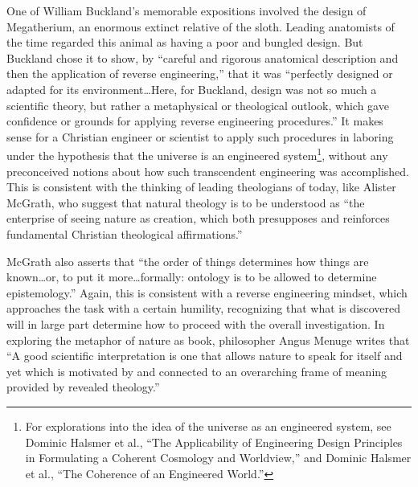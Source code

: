 One of William Buckland’s memorable expositions involved the design of
Megatherium, an enormous extinct relative of the
sloth.\citep[][pg. 245]{roberts1999}
Leading anatomists of the time regarded this
animal as having a poor and bungled design. But Buckland chose it to
show, by “careful and rigorous anatomical description and then the
application of reverse engineering,” that it was “perfectly designed or
adapted for its environment…Here, for Buckland, design was not so much
a scientific theory, but rather a metaphysical or theological outlook,
which gave confidence or grounds for applying reverse engineering
procedures.”\citep[][pg. 248]{roberts1999}
It makes sense for a Christian
engineer or scientist to apply such procedures in laboring under the
hypothesis that the universe is an engineered
system\footnote{
For explorations into the idea of the universe as an
engineered system, see Dominic Halsmer et al., “The Applicability of
Engineering Design Principles in Formulating a Coherent Cosmology and
Worldview,”\citep{halsmeretal2008} and Dominic Halsmer et al., “The Coherence of an
Engineered World.”\citep{halsmeretal2009b}
}, without any preconceived notions about how
such transcendent engineering was accomplished. This is consistent with
the thinking of leading theologians of today, like Alister McGrath, who
suggest that natural theology is to be understood as “the enterprise of
seeing nature as creation, which both presupposes and reinforces
fundamental Christian theological affirmations.”\citep[][pg. 64]{mcgrath2006}

McGrath also asserts that “the order of things determines how things are
known…or, to put it more…formally: ontology is to be allowed to
determine epistemology.”\citep[][pgs. xv--xvi]{mcgrath2006} Again, this is consistent
with a reverse engineering mindset, which approaches the task with a
certain humility, recognizing that what is discovered will in large
part determine how to proceed with the overall investigation. In
exploring the metaphor of nature as book, philosopher Angus Menuge
writes that “A good scientific interpretation is one that allows nature
to speak for itself and yet which is motivated by and connected to an
overarching frame of meaning provided by revealed
theology.”\citep[][pg. 96]{menuge2003}

